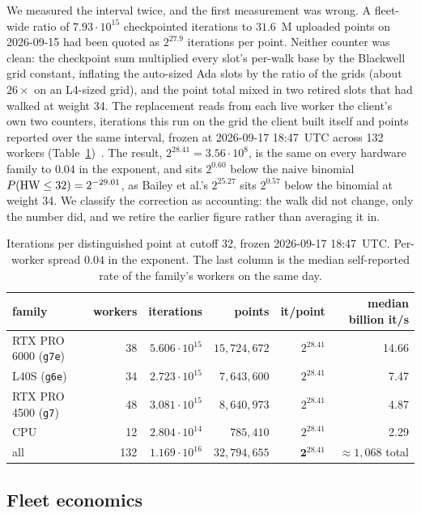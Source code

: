 We measured the interval twice, and the first measurement was
wrong. A fleet-wide ratio of $7.93\cdot10^{15}$ checkpointed
iterations to $31.6$~M uploaded points on 2026-09-15 had been quoted
as $2^{27.9}$ iterations per point. Neither counter was clean: the
checkpoint sum multiplied every slot's per-walk base by the Blackwell
grid constant, inflating the auto-sized Ada slots by the ratio of the
grids (about $26\times$ on an L4-sized grid), and the point total mixed in two retired slots that had walked at weight 34. The
replacement reads from each live worker the client's own two
counters, iterations this run on the grid the client built itself and
points reported over the same interval, frozen at 2026-09-17 18:47~UTC
across 132 workers (Table~\ref{tab:cutoff})~.
The result, $2^{28.41}=3.56\cdot10^8$, is the same on every hardware
family to $0.04$ in the exponent, and sits $2^{0.60}$ below the naive
binomial $P(\operatorname{HW}\le32)=2^{-29.01}$, as Bailey et al.'s $2^{25.27}$ sits
$2^{0.57}$ below the binomial at weight 34. We classify the
correction as accounting: the walk did not change, only the number
did, and we retire the earlier figure rather than averaging it in.

\begin{table}[t]
\centering
\small
\caption{Iterations per distinguished point at cutoff 32, frozen
  2026-09-17 18:47~UTC. Per-worker spread $0.04$ in the exponent. The
  last column is the median self-reported rate of the family's
  workers on the same day.}
\label{tab:cutoff}
\begin{tabular}{@{}lrrrrr@{}}
\toprule
family & workers & iterations & points & it/point & median billion it/s \\
\midrule
RTX PRO 6000 (\texttt{g7e}) & 38 & $5.606\cdot10^{15}$ & $15{,}724{,}672$ & $2^{28.41}$ & 14.66 \\
L40S (\texttt{g6e}) & 34 & $2.723\cdot10^{15}$ & $7{,}643{,}600$ & $2^{28.41}$ & 7.47 \\
RTX PRO 4500 (\texttt{g7}) & 48 & $3.081\cdot10^{15}$ & $8{,}640{,}973$ & $2^{28.41}$ & 4.87 \\
CPU & 12 & $2.804\cdot10^{14}$ & $785{,}410$ & $2^{28.41}$ & 2.29 \\
\midrule
all & 132 & $1.169\cdot10^{16}$ & $32{,}794{,}655$ & $\mathbf{2^{28.41}}$ & $\approx1{,}068$ total \\
\bottomrule
\end{tabular}
\end{table}

\subsection{Fleet economics}
\label{sec:campaign-goal28}

